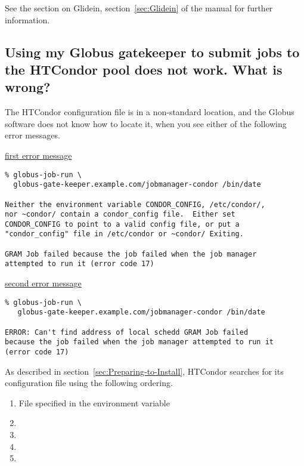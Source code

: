 See the section on Glidein, section~\ref{sec:Glidein} of the manual
for further information.


\subsection*{Using my Globus gatekeeper to submit jobs to the HTCondor pool
does not work.  What is wrong?}

The HTCondor configuration file is in a non-standard location,
and the Globus software does not know how to locate it,
when you see either of the following error messages.

\underline{first error message}
\footnotesize
\begin{verbatim}
% globus-job-run \
  globus-gate-keeper.example.com/jobmanager-condor /bin/date

Neither the environment variable CONDOR_CONFIG, /etc/condor/,
nor ~condor/ contain a condor_config file.  Either set
CONDOR_CONFIG to point to a valid config file, or put a
"condor_config" file in /etc/condor or ~condor/ Exiting.

GRAM Job failed because the job failed when the job manager
attempted to run it (error code 17)
\end{verbatim}
\normalsize

\underline{second error message}
\footnotesize
\begin{verbatim}
% globus-job-run \
   globus-gate-keeper.example.com/jobmanager-condor /bin/date

ERROR: Can't find address of local schedd GRAM Job failed
because the job failed when the job manager attempted to run it
(error code 17)
\end{verbatim}
\normalsize

As described in
section~\ref{sec:Preparing-to-Install}, 
HTCondor searches for its configuration file using the following
ordering.
\begin{enumerate}
\item File specified in the  environment variable
\item {}
\item {}
\item {}
\item {}
\end{enumerate}

